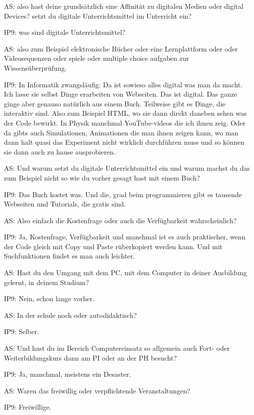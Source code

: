 \documentclass[fontsize=11pt,paper=a4]{scrbook}
\begin{document}
{\begin{itemize*}
\item[AS:]also hast deine grundsätzlich eine
Affinität zu digitalen Medien oder
digital Devices?
setzt du digitale Unterrichtsmittel
im Unterricht ein?
\item[IP9:]was sind digitale Unterrichtsmittel?
\item[AS:] also zum Beispiel elektronische Bücher oder
eine Lernplattform oder oder
Videosequenzen oder spiele oder multiple
choice aufgaben zur Wissensüberprüfung.
\item[IP9:] In Informatik zwangsläufig: Da ist sowieso alles digital
was man da macht. Ich lasse sie selbst
Dinge erarbeiten von Webseiten. Das ist
digital. Das ganze ginge aber genauso natürlich aus einem Buch. Teilweise gibt es Dinge,
die interaktiv sind. Also zum Beispiel HTML, wo sie dann direkt daneben sehen
was der Code bewirkt. In Physik
manchmal YouTube-videos die ich ihnen zeig. Oder da gibts auch Simulationen, Animationen die man ihnen zeigen kann, wo man dann halt quasi das Experiment nicht wirklich
durchführen muss und so können sie dann auch zu
hause ausprobieren.
\item[AS:]Und warum setzt du digitale Unterrichtsmittel ein und warum machst du
das zum Beispiel nicht so wie du vorher gesagt hast 
mit einem Buch?
\item[IP9:] Das Buch kostet was. Und die, grad beim programmieren gibt es tausende Webseiten und Tutorials, die gratis sind.
\item[AS:] Also einfach
die Kostenfrage oder auch die
Verfügbarkeit wahrscheinlich?
\item[IP9:] Ja, Kostenfrage, Verfügbarkeit und manchmal ist es auch
praktischer, wenn der Code gleich mit Copy und Paste rüberkopiert werden kann. Und mit Suchfunktionen findet es man auch leichter.
\item[AS:] Hast du den Umgang mit dem PC, mit dem Computer in deiner
Ausbildung gelernt, in deinem Studium? 
\item[IP9:] Nein, schon lange vorher.
\item[AS:] In der schule noch oder autodidaktisch?
\item[IP9:] Selber.
\item[AS:] Und hast du im Bereich Computereinsatz
so allgemein auch Fort- oder
Weiterbildungskurs dann am PI oder an der PH besucht?
\item[IP9:] Ja, manchmal, meistens ein Desaster.
\item[AS:] Waren das freiwillig oder
verpflichtende Veranstaltungen?
\item[IP9:] Freiwillige.

\end{itemize*}}
\end{document}
